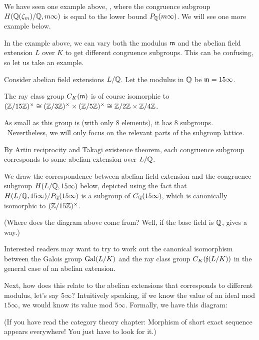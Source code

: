 We have seen one example above, , where the congruence subgroup
$H(\mathbb Q(\zeta_m)/\mathbb Q, m \infty)$ is equal to the lower bound $P_\mathbb Q(m \infty)$.
We will see one more example below.

\begin{example}
	In the example above, we can vary both the modulus $\mathfrak m$ and the abelian field extension $L$
	over $K$ to get different congruence subgroups.
	This can be confusing, so let us take an example.

	Consider abelian field extensions $L/\mathbb Q$. Let the modulus in $\mathbb Q$ be $\mathfrak m = 15 \infty$.

	The ray class group $C_K(\mathfrak m)$ is of course isomorphic to $(\mathbb Z/15\mathbb Z)^\times \cong (\mathbb Z/3\mathbb Z)^\times \times (\mathbb Z/5\mathbb Z)^\times
	\cong \mathbb Z/2\mathbb Z \times \mathbb Z/4\mathbb Z$.

	As small as this group is (with only 8 elements), it has 8 subgroups.%
	\footnotemark\ Nevertheless, we will only focus on the relevant parts of the subgroup lattice.

	By Artin reciprocity and Takagi existence theorem, each congruence subgroup corresponds to
	some abelian extension over $L/\mathbb Q$.

	We draw the correspondence between abelian field extension and the congruence subgroup
	$H(L/\mathbb Q, 15 \infty)$ below, depicted using the fact that
	$H(L/\mathbb Q, 15 \infty)/P_\mathbb Q(15 \infty)$ is a subgroup of $C_\mathbb Q(15 \infty)$,
	which is canonically isomorphic to $(\mathbb Z/15\mathbb Z)^\times$.
	\begin{center}
	\end{center}
	(Where does the diagram above come from? Well, if the base field is $\mathbb Q$,
	 gives a way.)

	Interested readers may want to try to work out the canonical isomorphism between the Galois
	group $\operatorname{Gal}(L/K)$ and the ray class group $C_K(\mathfrak f(L/K))$
	in the general case of an abelian extension.

	Next, how does this relate to the abelian extensions that corresponds to different modulus,
	let's say $5 \infty$?
	Intuitively speaking, if we know the value of an ideal mod $15 \infty$, we would know its
	value mod $5 \infty$. Formally, we have this diagram:
	\begin{center}
	\end{center}
	(If you have read the category theory chapter:
	Morphism of short exact sequence appears everywhere! You just have to look for it.)


\end{example}
